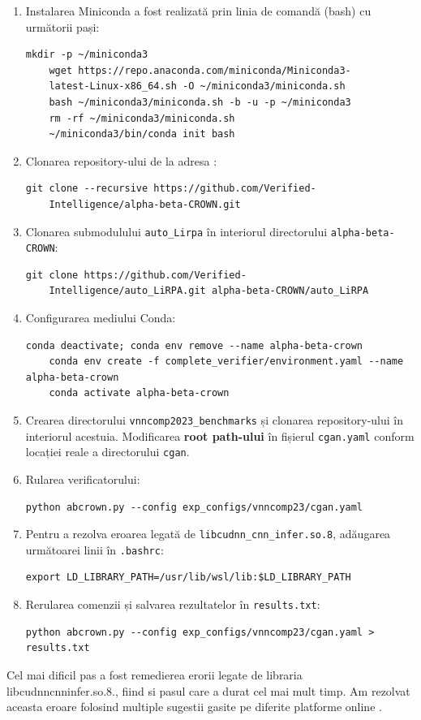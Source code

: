 \begin{enumerate}
  \item Instalarea Miniconda a fost realizată prin linia de comandă (bash) cu următorii pași:
  \begin{lstlisting}[style=bashstyle]
    mkdir -p ~/miniconda3
    wget https://repo.anaconda.com/miniconda/Miniconda3-
    latest-Linux-x86_64.sh -O ~/miniconda3/miniconda.sh
    bash ~/miniconda3/miniconda.sh -b -u -p ~/miniconda3
    rm -rf ~/miniconda3/miniconda.sh
    ~/miniconda3/bin/conda init bash
   \end{lstlisting}
  
  \item Clonarea repository-ului de la adresa \cite{crownrepository}:
    \begin{lstlisting}[style=bashstyle]
    git clone --recursive https://github.com/Verified-
    Intelligence/alpha-beta-CROWN.git
   \end{lstlisting}
  
  \item Clonarea submodulului \texttt{auto\_Lirpa} în interiorul directorului \texttt{alpha-beta-CROWN}:
    \begin{lstlisting}[style=bashstyle]
    git clone https://github.com/Verified-
    Intelligence/auto_LiRPA.git alpha-beta-CROWN/auto_LiRPA
   \end{lstlisting}
  
  \item Configurarea mediului Conda:
    \begin{lstlisting}[style=bashstyle]
    conda deactivate; conda env remove --name alpha-beta-crown
    conda env create -f complete_verifier/environment.yaml --name alpha-beta-crown
    conda activate alpha-beta-crown
   \end{lstlisting}
  
  \item Crearea directorului \texttt{vnncomp2023\_benchmarks} și clonarea repository-ului \cite{cganrepository} în interiorul acestuia. Modificarea \textbf{root path-ului} în fișierul \texttt{cgan.yaml} conform locației reale a directorului \texttt{cgan}.
  
  \item Rularea verificatorului:
  \begin{lstlisting}[style=bashstyle]
    python abcrown.py --config exp_configs/vnncomp23/cgan.yaml
  \end{lstlisting}
  
  \item Pentru a rezolva eroarea legată de \texttt{libcudnn\_cnn\_infer.so.8}, adăugarea următoarei linii în \texttt{.bashrc}:
  \begin{lstlisting}[style=bashstyle]
    export LD_LIBRARY_PATH=/usr/lib/wsl/lib:$LD_LIBRARY_PATH
  \end{lstlisting}
  
  \item Rerularea comenzii și salvarea rezultatelor în \texttt{results.txt}:
  \begin{lstlisting}[style=bashstyle]
    python abcrown.py --config exp_configs/vnncomp23/cgan.yaml > results.txt
  \end{lstlisting}
\end{enumerate}

Cel mai dificil pas a fost remedierea erorii legate de libraria libcudnn\textunderscore cnn\textunderscore infer.so.8., fiind si pasul care a durat cel mai mult timp. Am rezolvat aceasta eroare folosind multiple sugestii gasite pe diferite platforme online \cite{bashrcfix}.